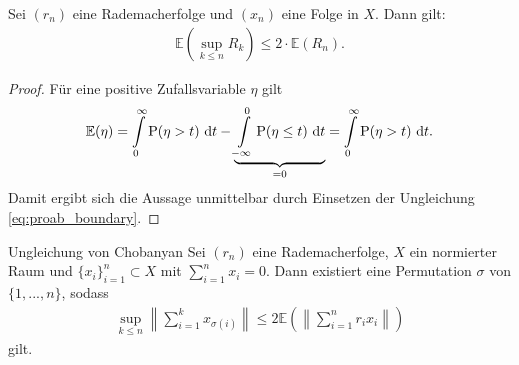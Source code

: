 \begin{lem}\label{th:expectation_estimate}
	Sei $ (r_n) $ eine Rademacherfolge und $ (x_n) $ eine Folge in $ X $.
	Dann gilt:
	\begin{align*}
		\mathbb{E}
		\left(
		\sup \limits_{k \leq n } R_k
		\right)
		\leq 2 \cdot
		\mathbb{E}(R_n).
	\end{align*}
	
\end{lem}

\begin{proof}
	Für eine positive Zufallsvariable $ \eta $ gilt
	\begin{align*}
		\mathbb{E}(\eta)
		=
		\int \limits_{0}^\infty \mathrm{P}(\eta > t) \ \mathrm{d} t
		- 
		\underbrace{\int \limits_{-\infty}^0 \mathrm{P}(\eta \leq  t) \ \mathrm{d} t}_{= 0}
		=
		\int \limits_{0}^\infty \mathrm{P}(\eta > t) \ \mathrm{d} t.
	\end{align*}
	Damit ergibt sich die Aussage unmittelbar durch Einsetzen der Ungleichung \eqref{eq:proab_boundary}.
\end{proof}
\newpage
\begin{genericthm}{Ungleichung von Chobanyan}
	Sei $ (r_n) $ eine Rademacherfolge, $ X $ ein normierter Raum und $ \{x_i\}_{i=1}^n \subset X $ mit $ \sum_{i = 1}^n  x_i = 0$.
	Dann existiert eine Permutation $ \sigma $ von $ \{1,...,n\} $, sodass 
	\begin{align*}
		\sup 
		\limits_{k \leq n}
		\left\|
		\sum \limits_{i = 1}^k
		x_{\sigma(i)}
		\right\|
		\leq 
		2 \mathbb{E}
		\left(
		\left\|
		\sum \limits_{i=1}^n
		r_i x_i
		\right\|
		\right)
	\end{align*}
	gilt.
\end{genericthm}

